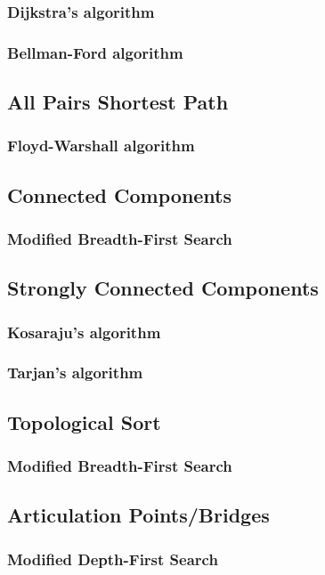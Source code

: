 \documentclass[11pt,a4paper,titlepage]{article}
\begin{document}
			\subsubsection{Dijkstra's algorithm}
				\begin{cppcode}
				\end{cppcode}
			\subsubsection{Bellman-Ford algorithm}
		\subsection{All Pairs Shortest Path}
			\subsubsection{Floyd-Warshall algorithm}
		\subsection{Connected Components}
			\subsubsection{Modified Breadth-First Search}
		\subsection{Strongly Connected Components}
			\subsubsection{Kosaraju's algorithm}
			\subsubsection{Tarjan's algorithm}
		\subsection{Topological Sort}
			\subsubsection{Modified Breadth-First Search}
		\subsection{Articulation Points/Bridges}
			\subsubsection{Modified Depth-First Search}
\end{document}
